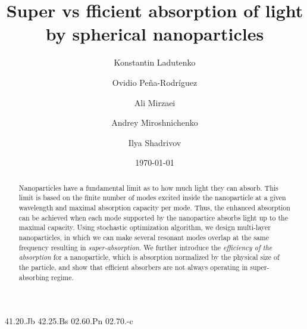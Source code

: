 \documentclass[aps,prl,twocolumn,showpacs,superscriptaddress,groupedaddress]{revtex4-1}
\begin{document}

\title{Super vs fficient absorption of light by spherical
  nanoparticles}


\author{Konstantin Ladutenko} 


\author{Ovidio Pe\~{n}a-Rodr\'{i}guez} 


\author{Ali Mirzaei} \author{Andrey Miroshnichenko} \author{Ilya
  Shadrivov} 

\date{\today}

\begin{abstract}
  Nanoparticles have a fundamental limit as to how much light they can
  absorb. This limit is based on the finite number of modes excited
  inside the nanoparticle at a given wavelength and maximal absorption
  capacity per mode. Thus, the enhanced absorption can be achieved
  when each mode supported by the nanopartice absorbs light up to the
  maximal capacity. Using stochastic optimization algorithm, we design
  multi-layer nanoparticles, in which we can make several resonant
  modes overlap at the same frequency resulting in {\it
    super-absorption}.  We further introduce the {\it efficiency of
    the absorption} for a nanoparticle, which is absorption normalized
  by the physical size of the particle, and show that efficient
  absorbers are not always operating in super-absorbing regime.
\end{abstract}


\pacs%
{41.20.Jb 42.25.Bs 02.60.Pn 02.70.-c}
\end{document}
